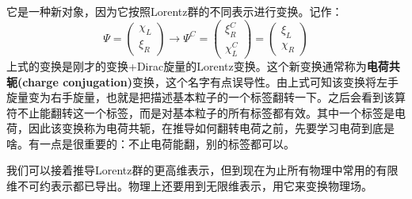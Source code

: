 它是一种新对象，因为它按照Lorentz群的不同表示进行变换。记作：
\begin{equation}
\label{equ3.236}
    \Psi =
        \begin{pmatrix}
            \chi_L \\ \xi_R
        \end{pmatrix}
    \rightarrow
    \Psi^C =
        \begin{pmatrix}
            \xi_R^C \\ \chi_L^C
        \end{pmatrix}
    =
        \begin{pmatrix}
            \xi_L \\ \chi_R
        \end{pmatrix}
\end{equation}
上式的变换是刚才的变换+Dirac旋量的Lorentz变换。这个新变换通常称为{\bf 电荷共轭(charge conjugation)}变换，这个名字有点误导性。由上式可知该变换将左手旋量变为右手旋量，也就是把描述基本粒子的一个标签翻转一下。之后会看到该算符不止能翻转这一个标签，而是对基本粒子的所有标签都有效。其中一个标签是电荷，因此该变换称为电荷共轭，在推导如何翻转电荷之前，先要学习电荷到底是啥。有一点是很重要的：不止电荷能翻，别的标签都可以。

我们可以接着推导Lorentz群的更高维表示，但到现在为止所有物理中常用的有限维不可约表示都已导出。物理上还要用到无限维表示，用它来变换物理场。

